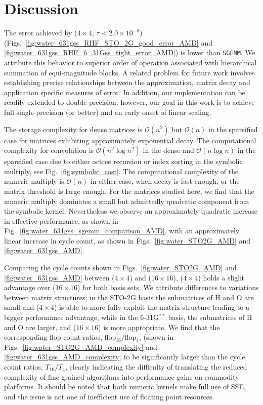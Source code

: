\section{Discussion}
\label{sec:discussion}

The error achieved by \SpAMM{}($4 \times 4$, $\tau < 2.0 \times 10^{-8}$)
(Figs.~\ref{fig:water_631gss_RHF_STO_2G_good_error_AMD} and
\ref{fig:water_631gss_RHF_6_31Gss_tight_error_AMD}) is lower than {\tt SGEMM}.
We attribute this behavior to superior order of operation associated with
hierarchical summation of equi-magnitude blocks. A related problem for future
work involves establishing precise relationships between the \SpAMM{}
approximation, matrix decay and application specific measures of error.  In
addition, our implementation can be readily extended to double-precision;
however, our goal in this work is to achieve full single-precision (or better)
and an early onset of linear scaling.

The storage complexity for dense matrices is $\mathcal{O} \left( n^{2}
\right)$ but $\mathcal{O} (n)$ in the sparsified case for matrices exhibiting
approximately exponential decay. The computational complexity for convolution
is $\mathcal{O} \left( n^{2} \log n^{2} \right)$ in the dense and $\mathcal{O}
\left( n \log n \right)$ in the sparsified case due to either octree recursion
or index sorting in the symbolic multiply, see Fig.~\ref{fig:symbolic_cost}.
The computational complexity of the numeric multiply is $\mathcal{O} (n)$ in
either case, when decay is fast enough, or the matrix threshold is large
enough. For the matrices studied here, we find that the numeric multiply
dominates a small but admittedly quadratic component from the symbolic kernel.
Nevertheless we observe an approximately quadratic increase in effective
performance, as shown in Fig.~\ref{fig:water_631gss_sgemm_comparison_AMD},
with an approximately linear increase in cycle count, as shown in
Figs.~\ref{fig:water_STO2G_AMD} and \ref{fig:water_631gss_AMD}.

Comparing the cycle counts shown in Figs.~\ref{fig:water_STO2G_AMD} and
\ref{fig:water_631gss_AMD} between \SpAMM{}($4 \times 4$) and \SpAMM{}($16
\times 16$), \SpAMM{}($4 \times 4$) holds a slight advantage over \SpAMM{}($16
\times 16$) for both basis sets. We attribute differences to variations
between matrix structures; in the STO-2G basis the submatrices of H and O are
small and \SpAMM{}($4 \times 4$) is able to more fully exploit the matrix
structure leading to a bigger performance advantage, while in the
6-31G${}^{**}$ basis, the submatrices of H and O are larger, and \SpAMM{}($16
\times 16$) is more appropriate. We find that the corresponding flop count
ratios, flop${}_{16}$/flop${}_{4}$, (shown in
Figs.~\ref{fig:water_STO2G_AMD_complexity} and
\ref{fig:water_631gss_AMD_complexity} to be significantly larger than the
cycle count ratios, $T_{16}/T_{4}$, clearly indicating the difficulty of
translating the reduced complexity of fine grained algorithms into performance
gains on commodity platforms. It should be noted that both numeric kernels
make full use of SSE, and the issue is not one of inefficient use of floating
point resources.

